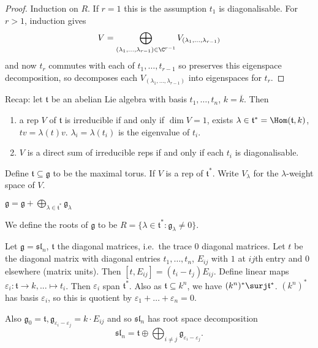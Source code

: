 \documentclass[a4paper]{article}
\newcommand*{\Lie}[1]{\mathfrak{#1}} %
\begin{document}
\begin{proof}
  Induction on \(R\). If \(r = 1\) this is the assumption \(t_1\) is diagonalisable. For \(r > 1\), induction gives
  \[
    V = \bigoplus_{(\lambda_1, \dots, \lambda_{r - 1}) \in \C^{r - 1}} V_{(\lambda_1, \dots, \lambda_{r - 1})}
  \]
  and now \(t_r\) commutes with each of \(t_1, \dots, t_{r - 1}\) so preserves this eigenspace decomposition, so decomposes each \(V_{(\lambda_1, \dots, \lambda_{r - 1})}\) into eigenspaces for \(t_r\).
\end{proof}

Recap: let \(\Lie t\) be an abelian Lie algebra with basis \(t_1, \dots, t_n\), \(k = \overline k\). Then
\begin{enumerate}
\item a rep \(V\) of \(\Lie t\) is irreducible if and only if \(\dim V = 1\), exists \(\lambda \in \Lie t^* = \Hom(\Lie t, k)\), \(t v = \lambda(t) v\). \(\lambda_i = \lambda(t_i)\) is the eigenvalue of \(t_i\).
\item \(V\) is a direct sum of irreducible reps if and only if each \(t_i\) is diagonalisable.
\end{enumerate}

Define \(\Lie t \subseteq \Lie g\) to be the maximal torus. If \(V\) is a rep of \(\Lie t^*\). Write \(V_\lambda\) for the \(\lambda\)-weight space of \(V\).

\begin{corollary}
  \(\Lie g = \Lie g + \bigoplus_{\lambda \in \Lie t^*} \Lie g_\lambda\)
\end{corollary}

\begin{definition}
  We define the roots of \(\Lie g\) to be \(R = \{\lambda \in \Lie t^*: \Lie g_\lambda \neq 0\}\).
\end{definition}

\begin{eg}
  Let \(\Lie g = \Lie{sl}_n\), \(\Lie t\) the diagonal matrices, i.e.\ the trace \(0\) diagonal matrices. Let \(t\) be the diagonal matrix with diagonal entries \(t_1, \dots, t_n\), \(E_{ij}\) with \(1\) at \(ij\)th entry and \(0\) elsewhere (matrix units). Then \([t, E_{ij}] = (t_i - t_j) E_{ij}\). Define linear maps \(\varepsilon_i: \Lie t \to k, ... \mapsto t_i\). Then \(\varepsilon_i\) span \(\Lie t^*\). Also as \(\Lie t \subseteq k^n\), we have \((k^n)^* \surj \Lie t^*\). \((k^n)^*\) has basis \(\varepsilon_i\), so this is quotient by \(\varepsilon_1 + \dots + \varepsilon_n = 0\).

  Also \(\Lie g_0 = \Lie t, \Lie g_{\varepsilon_i - \varepsilon_j} = k \cdot E_{ij}\) and so \(\Lie{sl}_n\) has root space decomposition
  \[
    \Lie{sl}_n = \Lie t \oplus \bigoplus_{i \neq j} \Lie g_{\varepsilon_i - \varepsilon_j}.
  \]
\end{eg}
\end{document}
